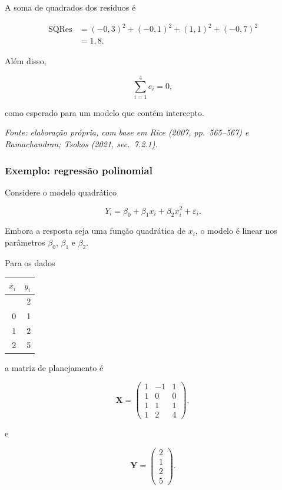 \documentclass[
  letterpaper,
  DIV=11,
  numbers=noendperiod]{scrreprt}
\begin{document}
A soma de quadrados dos resíduos é

\[\begin{aligned}
\operatorname{SQRes}
&=
(-0{,}3)^2
+
(-0{,}1)^2
+
(1{,}1)^2
+
(-0{,}7)^2\\
&=
1{,}8.
\end{aligned}\]

Além disso,

\[\sum_{i=1}^4e_i=0,\]

como esperado para um modelo que contém intercepto.

\emph{Fonte: elaboração própria, com base em Rice (2007, pp.~565--567) e
Ramachandran; Tsokos (2021, sec.~7.2.1).}

\subsubsection{Exemplo: regressão
polinomial}\label{exemplo-regressuxe3o-polinomial}

Considere o modelo quadrático

\[Y_i
=
\beta_0+\beta_1x_i+\beta_2x_i^2+\varepsilon_i.\]

Embora a resposta seja uma função quadrática de \(x_i\), o modelo é
linear nos parâmetros \(\beta_0\), \(\beta_1\) e \(\beta_2\).

Para os dados

\begin{longtable}[]{@{}rr@{}}
\toprule\noalign{}
\(x_i\) & \(y_i\) \\
\midrule\noalign{}
\endhead
\bottomrule\noalign{}
\endlastfoot
-1 & 2 \\
0 & 1 \\
1 & 2 \\
2 & 5 \\
\end{longtable}

a matriz de planejamento é

\[\mathbf{X}
=
\begin{pmatrix}
1&-1&1\\
1&0&0\\
1&1&1\\
1&2&4
\end{pmatrix},\]

e

\[\mathbf{Y}
=
\begin{pmatrix}
2\\
1\\
2\\
5
\end{pmatrix}.\]
\end{document}
